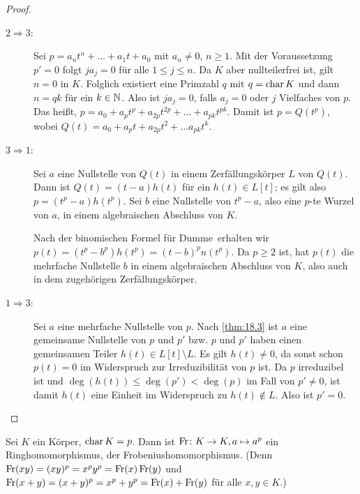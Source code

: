 \documentclass[12pt,a4paper]{scrartcl}
\begin{document}
\begin{proof}
	\leavevmode
	\begin{description}
		\item[\glqq$2\Rightarrow3$\grqq:] Sei $p = a_nt^n+\dots +a_1t+a_0$ mit $a_n \neq 0$, $n\geq 1$. Mit der Voraussetzung $p' = 0$ folgt $ja_j = 0$ für alle $1\leq j\leq n$. Da $K$ aber nullteilerfrei ist, gilt $n = 0$ in $K$. Folglich existiert eine Primzahl $q$ mit $q = \operatorname{char} K$ und dann $n = qk$ für ein $k\in\mathbb N$. Also ist $ja_j = 0$, falls $a_j = 0$ oder $j$ Vielfaches von $p$. Das heißt, $p = a_0+a_pt^p+a_{2p}t^{2p}+\dots+a_{pk}t^{pk}$. Damit ist $p = Q(t^p)$, wobei $Q(t)= a_0+a_pt+a_{2p}t^2+\dots a_{pk}t^k$.
		\item[\glqq$3\Rightarrow1$\grqq:] Sei $a$ eine Nullstelle von $Q(t)$ in einem Zerfällungskörper $L$ von $Q(t)$. Dann ist $Q(t) = (t-a)h(t)$ für ein $h(t)\in L[t]$; es gilt also $p = (t^p-a)h(t^p)$. Sei $b$ eine Nullstelle von $t^p-a$, also eine $p$-te Wurzel von $a$, in einem algebraischen Abschluss von $K$. 
		
		Nach der binomischen Formel \glqq für Dumme\grqq\ erhalten wir $p(t) = (t^p-b^p)h(t^p) = (t-b)^pn(t^p)$. Da $p\geq 2$ ist, hat $p(t)$ die mehrfache Nullstelle $b$ in einem algebraischen Abschluss von $K$, also auch in dem zugehörigen Zerfällungskörper.
		\item[\glqq$1\Rightarrow3$\grqq:] Sei $a$ eine mehrfache Nullstelle von $p$. Nach \cref{thm:18.3} ist $a$ eine gemeinsame  Nullstelle von $p$ und $p'$ bzw. $p$ und $p'$ haben einen gemeinsamen Teiler $h(t)\in L[t]\setminus L$. Es gilt $h(t)\neq 0$, da sonst schon $p(t) = 0$ im Widerspruch zur Irreduzibilität von $p$ ist. Da $p$ irreduzibel ist und $\deg(h(t)) \leq \deg(p')<\deg(p)$ im Fall von $p' \neq 0$, ist damit $h(t)$ eine Einheit im Widerspruch zu $h(t) \notin L$. Also ist $p' = 0$.
  \qedhere
	\end{description}
\end{proof}

\begin{defi}
	Sei $K$ ein Körper, $\operatorname{char} K = p$. Dann ist $\operatorname{Fr}\colon K\to K, a\mapsto a^p$ ein Ringhomomorphismus, der Frobeniushomomorphismus. (Denn $\operatorname{Fr}(xy) = (xy)^p = x^py^p = \operatorname{Fr}(x)\operatorname{Fr}(y)$ und $\operatorname{Fr}(x+y) = (x+y)^p = x^p+y^p = \operatorname{Fr}(x) + \operatorname{Fr}(y)$ für alle $x,y\in K$.)
\end{defi}
\end{document}
